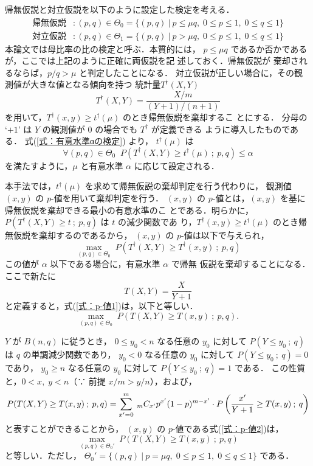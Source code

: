 \documentclass[japanese]{jnlp_1.4}
\begin{document}
帰無仮説と対立仮説を以下のように設定した検定を考える．
\begin{align*}
 帰無仮説 &: 
   (p,q)\in \Theta_0 
        = \{(p,q) \:|\: p \leq \mu q, \; 
                                   0\leq p \leq 1, \; 0\leq q \leq 1 \}\\
 対立仮説 &: 
   (p,q)\in \Theta_1 
        = \{(p,q) \:|\: p > \mu q, \; 
                                   0\leq p \leq 1, \; 0\leq q \leq 1 \}
\end{align*}
本論文では母比率の比の検定と呼ぶ．本質的には，
$p\leq \mu q$ であるか否かであるが，ここでは上記のように正確に両仮説を記
述しておく．帰無仮説が
棄却されるならば，$p/q>\mu$ と判定したことになる．
対立仮説が正しい場合に，その観測値が大きな値となる傾向を持つ
統計量$T^\dagger(X,Y)$
\[
 T^\dagger(X,Y)=\frac{X/m}{(Y+1)/(n+1)}
\]
を用いて，$T^\dagger(x,y)\geq t^\dagger(\mu)$ のとき帰無仮説を棄却するこ
とにする．
分母の `$+1$' は $Y$ の観測値が 0 の場合でも $T^\dagger$ が定義できる
ように導入したものである．
式(\ref{式：有意水準αの検定}) より，
$t^\dagger(\mu)$ は
\begin{equation}\label{式：検定基礎}
\forall (p,q)\in \Theta_0\;\;
 P(T^\dagger(X,Y)\geq t^\dagger(\mu) \:;\: p,q) \leq \alpha
\end{equation}
を満たすように，$\mu$ と有意水準 $\alpha$ に応じて設定される．

本手法では，$t^\dagger(\mu)$ を求めて帰無仮説の棄却判定を行う代わりに，
観測値 $(x,y)$ の $p$-値を用いて棄却判定を行う．
$(x,y)$ の $p$-値とは，$(x,y)$ を基に帰無仮説を棄却できる最小の有意水準のこ
とである．明らかに，$P(T^\dagger(X,Y)\geq t \:;\: p, q)$ は $t$ の減少関数であ
り，$T^\dagger(x,y)\geq t^\dagger(\mu)$ のとき帰無仮説を棄却するのであるから，
$(x,y)$ の $p$-値は以下で与えられ，
\begin{equation}\label{式：p-値1}
\max_{(p,q) \in \Theta_0}\; P(T^\dagger(X,Y)\geq T^\dagger(x,y) \:;\: p, q)
\end{equation}
この値が $\alpha$ 以下である場合に，有意水準 $\alpha$ で帰無
仮説を棄却することになる．ここで新たに
\[
T(X,Y)=\frac{X}{Y+1}
\]
と定義すると，式(\ref{式：p-値1})は，以下と等しい．
\begin{equation}\label{式：p-値2}
\max_{(p,q)\in \Theta_0}\; P(T(X,Y)\geq T(x,y) \:;\: p, q).
\end{equation}

$Y$ が $B(n,q)$ に従うとき，
$0\leq y_0 <n$ なる任意の $y_0$ に対して
$P(Y\leq y_0 \:;\: q)$ は $q$ の単調減少関数であり，
$y_0 <0$ なる任意の $y_0$ に対して $P(Y\leq y_0 \:;\: q)=0$ であり，
$y_0 \geq n$ なる任意の $y_0$ に対して $P(Y\leq y_0 \:;\: q)=1$ である．
この性質と，$0<x,\;y<n$（∵ 前提 $x/m>y/n$），および，
\[
P(T(X,Y)\geq T(x,y)\:;\: p,q)
= \sum_{x'=0}^m \: 
     \rule{0pt}{1pt}_mC_{x'} p^{x'}(1-p)^{m-x'}\cdot 
        P\left(\frac{x'}{Y+1}\geq T(x,y) \:;\: q \right)
\]
と表すことができることから，
$(x,y)$ の $p$-値である式(\ref{式：p-値2})は，
\begin{equation}\label{式：p-値3}
\max_{(p,q)\in \Theta_0'}\; P(T(X,Y)\geq T(x,y) \:;\: p, q)
\end{equation}
と等しい．ただし，
$ \Theta_0' = \{(p,q)\:|\: p=\mu q,\; 0\leq p\leq 1,\; 0\leq q\leq 1 \}$
である．
\end{document}
